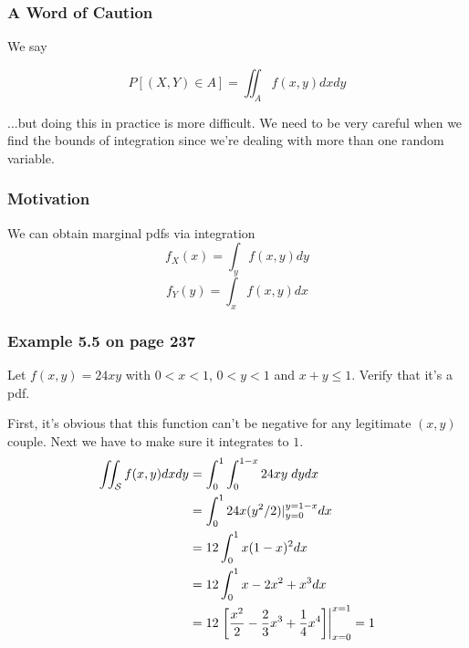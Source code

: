 \documentclass{beamer}
\begin{document}
\begin{frame}
\frametitle{A Word of Caution}

We say

\[
P[(X,Y) \in A] = \iint_A f(x,y) dxdy
\]

...but doing this in practice is more difficult. We need to be very careful when we find the bounds of integration since we're dealing with more than one random variable. 

\end{frame}

\begin{frame}
\frametitle{Motivation}

We can obtain marginal pdfs via integration
\[
f_X(x) = \int_y f(x,y)dy
\]
\[
f_Y(y) = \int_x f(x,y)dx
\]

\end{frame}

\begin{frame}
\frametitle{Example 5.5 on page 237}

Let $f(x,y) = 24xy$ with $0 < x < 1$, $0 < y < 1$ and $x+y \le 1$. Verify that it's a pdf.
\pause
\newline

First, it's obvious that this function can't be negative for any legitimate $(x,y)$ couple. Next we have to make sure it integrates to $1$.
\begin{align*}
\iint_{\mathcal{S}} f(x,y)dxdy &= \int_0^1 \int_0^{1-x} 24 x y\hspace{1mm} dy dx\\
&= \int_0^1 24 x (y^2/2 )|_{y=0}^{y=1-x} dx \\
&= 12 \int_0^1 x (1-x)^2 dx \\
&= 12 \int_0^1 x - 2x^2 + x^3 dx \\
&= 12 \left. \left[ \frac{x^2}{2} - \frac{2}{3}x^3 + \frac{1}{4}x^4 \right] \right|_{x=0}^{x=1} = 1
\end{align*}

\end{frame}
\end{document}
